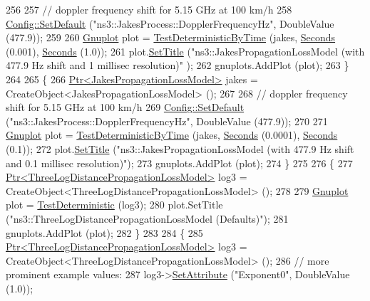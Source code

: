 \begin{DoxyCode}
256 
257     \textcolor{comment}{// doppler frequency shift for 5.15 GHz at 100 km/h}
258     \hyperlink{group__config_ga2e7882df849d8ba4aaad31c934c40c06}{Config::SetDefault} (\textcolor{stringliteral}{"ns3::JakesProcess::DopplerFrequencyHz"}, DoubleValue (477.9));
259 
260     \hyperlink{classns3_1_1Gnuplot}{Gnuplot} plot = \hyperlink{main-propagation-loss_8cc_a093207d9d8a33b2bfc987434a52eeecc}{TestDeterministicByTime} (jakes, 
      \hyperlink{group__timecivil_ga33c34b816f8ff6628e33d5c8e9713b9e}{Seconds} (0.001), \hyperlink{group__timecivil_ga33c34b816f8ff6628e33d5c8e9713b9e}{Seconds} (1.0));
261     plot.\hyperlink{classns3_1_1Gnuplot_ac01f15633d49f0239f8a45293a1e04f0}{SetTitle} (\textcolor{stringliteral}{"ns3::JakesPropagationLossModel (with 477.9 Hz shift and 1 millisec resolution)"}
      );
262     gnuplots.AddPlot (plot);
263   \}
264 
265   \{
266     \hyperlink{classns3_1_1Ptr}{Ptr<JakesPropagationLossModel>} jakes = 
      CreateObject<JakesPropagationLossModel> ();
267 
268     \textcolor{comment}{// doppler frequency shift for 5.15 GHz at 100 km/h}
269     \hyperlink{group__config_ga2e7882df849d8ba4aaad31c934c40c06}{Config::SetDefault} (\textcolor{stringliteral}{"ns3::JakesProcess::DopplerFrequencyHz"}, DoubleValue (477.9));
270 
271     \hyperlink{classns3_1_1Gnuplot}{Gnuplot} plot = \hyperlink{main-propagation-loss_8cc_a093207d9d8a33b2bfc987434a52eeecc}{TestDeterministicByTime} (jakes, 
      \hyperlink{group__timecivil_ga33c34b816f8ff6628e33d5c8e9713b9e}{Seconds} (0.0001), \hyperlink{group__timecivil_ga33c34b816f8ff6628e33d5c8e9713b9e}{Seconds} (0.1));
272     plot.\hyperlink{classns3_1_1Gnuplot_ac01f15633d49f0239f8a45293a1e04f0}{SetTitle} (\textcolor{stringliteral}{"ns3::JakesPropagationLossModel (with 477.9 Hz shift and 0.1 millisec
       resolution)"});
273     gnuplots.AddPlot (plot);
274   \}
275 
276   \{
277     \hyperlink{classns3_1_1Ptr}{Ptr<ThreeLogDistancePropagationLossModel>} log3 = 
      CreateObject<ThreeLogDistancePropagationLossModel> ();
278 
279     \hyperlink{classns3_1_1Gnuplot}{Gnuplot} plot = \hyperlink{main-propagation-loss_8cc_a4e5137292d7c72e9726190680c642e7d}{TestDeterministic} (log3);
280     plot.SetTitle (\textcolor{stringliteral}{"ns3::ThreeLogDistancePropagationLossModel (Defaults)"});
281     gnuplots.AddPlot (plot);
282   \}
283 
284   \{
285     \hyperlink{classns3_1_1Ptr}{Ptr<ThreeLogDistancePropagationLossModel>} log3 = 
      CreateObject<ThreeLogDistancePropagationLossModel> ();
286     \textcolor{comment}{// more prominent example values:}
287     log3->\hyperlink{classns3_1_1ObjectBase_ac60245d3ea4123bbc9b1d391f1f6592f}{SetAttribute} (\textcolor{stringliteral}{"Exponent0"}, DoubleValue (1.0));

\end{DoxyCode}
